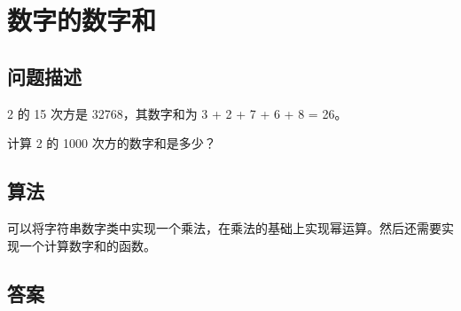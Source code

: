 \section{数字的数字和}
\subsection{问题描述}
\begin{tcolorbox}
2 的 15 次方是 32768，其数字和为 3 + 2 + 7 + 6 + 8 = 26。

计算 2 的 1000 次方的数字和是多少？
\end{tcolorbox}

\subsection{算法}
可以将字符串数字类中实现一个乘法，在乘法的基础上实现幂运算。然后还需要实现一个计算数字和的函数。

\subsection{答案}
